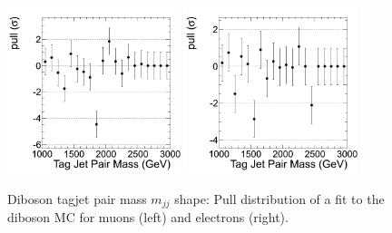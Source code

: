 \begin{figure}
\begin{center}
\includegraphics[width=0.45\textwidth]{figs/wpj/EWKW2jetstagjetmjj_diboson_muon_Model_12_Validate_pull.png}
\includegraphics[width=0.45\textwidth]{figs/wpj/EWKW2jetstagjetmjj_diboson_electron_Model_12_Validate_pull.png}
\end{center}
\caption{\label{fig:dibosonFit} Diboson tagjet pair mass $m_{jj}$ shape: Pull distribution of a fit to the diboson MC for muons (left) and electrons (right).}
\label{fig:dibosonFit_Dijet_Pull}
\end{figure}

